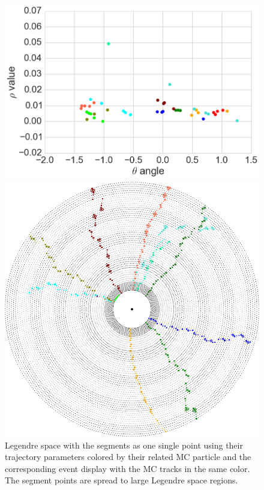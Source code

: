 \begin{figure}
  \centering
  \begin{minipage}{0.48\linewidth}
    \includegraphics[width=\linewidth]{figures/workflow/quad_tree_segments.png}
  \end{minipage}
  \begin{minipage}{0.48\linewidth}
    \includegraphics[width=\linewidth]{figures/workflow/quad_tree_segments_event.png}
  \end{minipage}
  \caption{Legendre space with the segments as one single point using their trajectory parameters colored by their related MC particle and the corresponding event display with the MC tracks in the same color. The segment points are spread to large Legendre space regions.}
  \label{fig-quad-tree-segments}
\end{figure}


